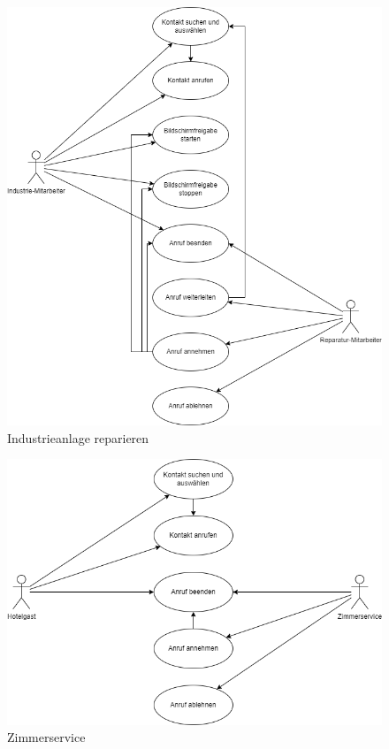 \begin{figure}[ht!]
    \includegraphics[width=\paperwidth-2in]{../assets/img/UML-Anwendungsfalldiagramme-Industrieanlage reparieren.drawio}
    \caption{Industrieanlage reparieren}
    \label{fig:industrieanlage-reparieren}
\end{figure}

\begin{figure}[ht!]
    \includegraphics[width=\paperwidth-2in]{../assets/img/UML-Anwendungsfalldiagramme-Zimmerservice.drawio}
    \caption{Zimmerservice}
    \label{fig:zimmerservice}
\end{figure}

